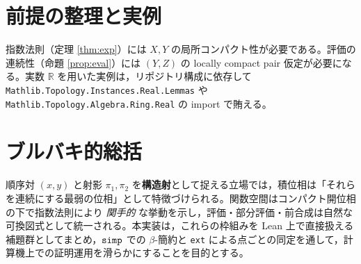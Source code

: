 \documentclass[11pt]{jsarticle}
\theoremstyle{remark}
\begin{document}
\section{前提の整理と実例}
指数法則（定理 \ref{thm:exp}）には $X,Y$ の局所コンパクト性が必要である。評価の連続性（命題 \ref{prop:eval}）には $(Y,Z)$ の locally compact pair 仮定が必要になる。実数 $\mathbb{R}$ を用いた実例は，リポジトリ構成に依存して \verb|Mathlib.Topology.Instances.Real.Lemmas| や \verb|Mathlib.Topology.Algebra.Ring.Real| の import で賄える。

\section{ブルバキ的総括}
順序対 $(x,y)$ と射影 $\pi_1,\pi_2$ を\textbf{構造射}として捉える立場では，積位相は「それらを連続にする最弱の位相」として特徴づけられる。関数空間はコンパクト開位相の下で指数法則により \emph{関手的} な挙動を示し，評価・部分評価・前合成は自然な可換図式として統一される。本実装は，これらの枠組みを Lean 上で直接扱える補題群としてまとめ，$\verb|simp|$ での $\beta$-簡約と \verb|ext| による点ごとの同定を通して，計算機上での証明運用を滑らかにすることを目的とする。
\end{document}

